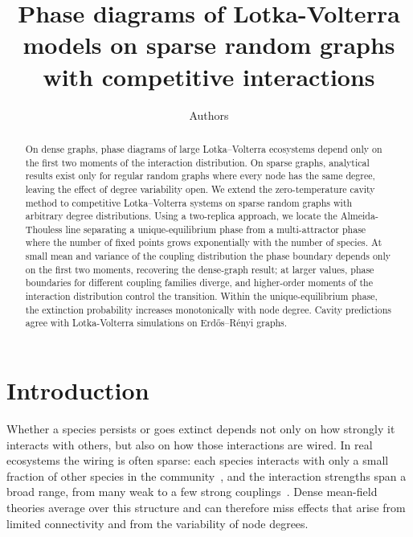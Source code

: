 \documentclass[11pt,a4paper]{article}
\begin{document}
\title{Phase diagrams of Lotka-Volterra models on sparse random graphs with competitive interactions}
\author{Authors}
\date{}

\maketitle


\begin{abstract}
    On dense graphs, phase diagrams of large Lotka--Volterra ecosystems depend only on the first two moments of the interaction distribution.  On sparse graphs, analytical results exist only for regular random graphs where every node has the same degree, leaving the effect of degree variability open.  We extend the zero-temperature cavity method to competitive Lotka--Volterra systems on sparse random graphs with arbitrary degree distributions.  Using a two-replica approach, we locate the Almeida-Thouless line separating a unique-equilibrium phase from a multi-attractor phase where the number of fixed points grows exponentially with the number of species.  At small mean and variance of the coupling distribution the phase boundary depends only on the first two moments, recovering the dense-graph result; at larger values, phase boundaries for different coupling families diverge, and higher-order moments of the interaction distribution control the transition.  Within the unique-equilibrium phase, the extinction probability increases monotonically with node degree.  Cavity predictions agree with Lotka-Volterra simulations on Erd\H{o}s--R\'{e}nyi graphs.
\end{abstract}

\section{Introduction}
Whether a species persists or goes extinct depends not only on how strongly it interacts with others, but also on how those interactions are wired. In  real ecosystems the wiring is  often sparse: each species  interacts with only a small fraction of other species in the community~\cite{jordano2016sampling,comita2010}, and the  interaction strengths span a broad range, from many weak to a few strong couplings~\cite{wootton2005measurement}. Dense mean-field theories average over this structure and can therefore miss effects that arise from limited connectivity and from the variability of node degrees.
\end{document}
